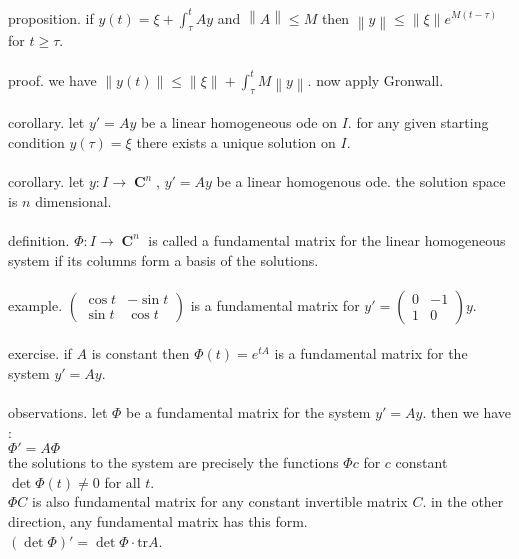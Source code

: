 \documentclass{article}
\newcommand{\trace}{\text{tr}}
\DeclareMathOperator{\C}{\mathbf{C}}
\newcommand{\norm}[1]{\left\lVert#1\right\rVert}
\begin{document}
proposition. if $y(t)=\xi+\int_\tau^t Ay$ and $\norm{A}\le M$ then $\norm{y}\le \norm{\xi}e^{M(t-\tau)}$ for $t\ge \tau$. \\\\
proof. we have $\norm{y(t)}\le \norm{\xi}+\int_\tau^t M\norm{y}$. now apply Gronwall. \\\\
corollary. let $y'=Ay$ be a linear homogeneous ode on $I$. for any given starting condition $y(\tau)=\xi$ there exists a unique solution on $I$. \\\\
corollary. let $y:I\to \C^n$, $y'=Ay$ be a linear homogenous ode. the solution space is $n$ dimensional. \\\\
definition. $\Phi:I\to \C^n$ is called a fundamental matrix for the linear homogeneous system  if its columns form a basis of the solutions. \\\\
example. $\left(\begin{array}{cc}
\cos t & -\sin t\\
\sin t & \cos t
\end{array}\right)$ is a fundamental matrix for $y'=\left(\begin{array}{cc}
0 & -1\\
1 & 0
\end{array}\right)y$. \\\\
exercise. if $A$ is constant then $\Phi(t)=e^{tA}$ is a fundamental matrix for the system $y'=Ay$. \\\\
observations. let $\Phi$ be a fundamental matrix for the system $y'=Ay$. then we have :\\
$\Phi'=A\Phi$ \\
the solutions to the system are precisely the functions $\Phi c$ for $c$ constant \\
$\det \Phi(t)\neq 0$ for all $t$. \\
$\Phi C$ is also fundamental matrix for any constant invertible matrix $C$. in the other direction, any fundamental matrix has this form. \\
$(\det \Phi)' =\det \Phi \cdot \trace A$. \\
\end{document}
